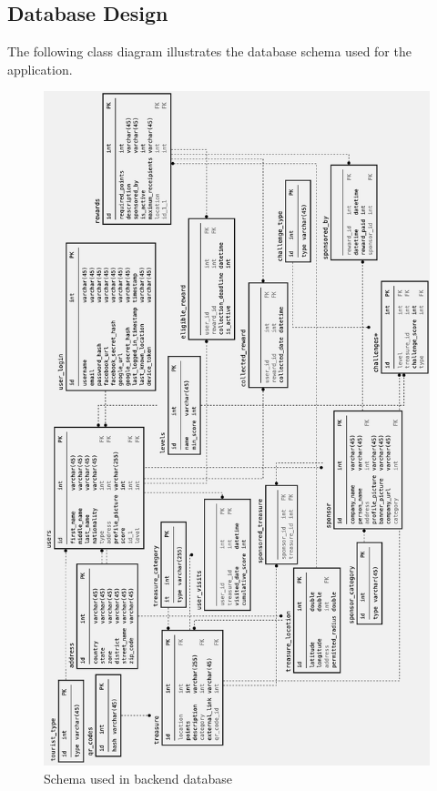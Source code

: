 \documentclass[12pt, a4paper, oneside]{article}
\begin{document}
\subsection{Database Design}
The following class diagram illustrates the database schema used for the application. 

\begin{figure}[H]
\includegraphics[height=0.8\paperheight, keepaspectratio]{db/schema.png}
\centering
\caption{Schema used in backend database}
\label{fig:db-schema}
\end{figure}
\end{document}
